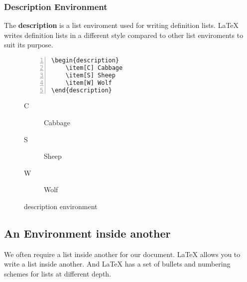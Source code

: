 \documentclass{article}
\begin{document}
\subsubsection{Description Environment}
The \textbf{description} is a list enviroment used for writing definition lists. \LaTeX{} writes definition lists in a different style compared to other list enviroments to suit its purpose.
\begin{figure}[h]
\centering
\begin{minipage}{0.45\textwidth}
\begin{Verbatim}[numbers = left]
\begin{description}
	\item[C] Cabbage
	\item[S] Sheep
	\item[W] Wolf
\end{description}
\end{Verbatim}
\end{minipage}
\begin{minipage}{0.45\textwidth}
\begin{description}
	\item[C] Cabbage
	\item[S] Sheep
	\item[W] Wolf
\end{description}
\end{minipage}
\caption{description environment}
\end{figure}

\subsection{An Environment inside another}
We often require a list inside another for our document. \LaTeX{} allows you to write a list inside another. And \LaTeX{} has a set of bullets and numbering schemes for lists at different depth.
\end{document}
